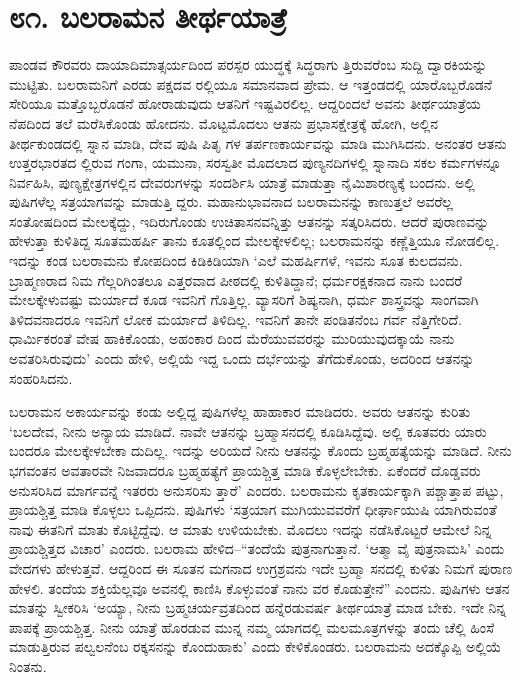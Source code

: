 
\chapter{೮೧. ಬಲರಾಮನ ತೀರ್ಥಯಾತ್ರೆ}

ಪಾಂಡವ ಕೌರವರು ದಾಯಾದಿಮಾತ್ಸರ್ಯದಿಂದ ಪರಸ್ಪರ ಯುದ್ಧಕ್ಕೆ ಸಿದ್ಧರಾಗು ತ್ತಿರುವರೆಂಬ ಸುದ್ದಿ ದ್ವಾರಕಿಯನ್ನು ಮುಟ್ಟಿತು. ಬಲರಾಮನಿಗೆ ಎರಡು ಪಕ್ಷದವ ರಲ್ಲಿಯೂ ಸಮಾನವಾದ ಪ್ರೇಮ. ಆ ಇತ್ತಂಡದಲ್ಲಿ ಯಾರೊಬ್ಬರೊಡನೆ ಸೇರಿಯೂ ಮತ್ತೊಬ್ಬರೊಡನೆ ಹೋರಾಡುವುದು ಆತನಿಗೆ ಇಷ್ಟವಿರಲಿಲ್ಲ. ಆದ್ದರಿಂದಲೆ ಅವನು ತೀರ್ಥಯಾತ್ರೆಯ ನೆಪದಿಂದ ತಲೆ ಮರೆಸಿಕೊಂಡು ಹೋದನು. ಮೊಟ್ಟಮೊದಲು ಆತನು ಪ್ರಭಾಸಕ್ಷೇತ್ರಕ್ಕೆ ಹೋಗಿ, ಅಲ್ಲಿನ ತೀರ್ಥಕುಂಡದಲ್ಲಿ ಸ್ನಾನ ಮಾಡಿ, ದೇವ ಪುಷಿ ಪಿತೃ ಗಳ ತರ್ಪಣಕಾರ್ಯವನ್ನು ಮಾಡಿ ಮುಗಿಸಿದನು. ಅನಂತರ ಆತನು ಉತ್ತರಭಾರತದ ಲ್ಲಿರುವ ಗಂಗಾ, ಯಮುನಾ, ಸರಸ್ವತೀ ಮೊದಲಾದ ಪುಣ್ಯನದಿಗಳಲ್ಲಿ ಸ್ನಾನಾದಿ ಸಕಲ ಕರ್ಮಗಳನ್ನೂ ನಿರ್ವಹಿಸಿ, ಪುಣ್ಯಕ್ಷೇತ್ರಗಳಲ್ಲಿನ ದೇವರುಗಳನ್ನು ಸಂದರ್ಶಿಸಿ ಯಾತ್ರೆ ಮಾಡುತ್ತಾ ನೈಮಿಶಾರಣ್ಯಕ್ಕೆ ಬಂದನು. ಅಲ್ಲಿ ಪುಷಿಗಳೆಲ್ಲ ಸತ್ರಯಾಗವನ್ನು ಮಾಡುತ್ತಿ ದ್ದರು. ಮಹಾನುಭಾವನಾದ ಬಲರಾಮನನ್ನು ಕಾಣುತ್ತಲೆ ಅವರೆಲ್ಲ ಸಂತೋಷದಿಂದ ಮೇಲಕ್ಕೆದ್ದು, ಇದಿರುಗೊಂಡು ಉಚಿತಾಸನವನ್ನಿತ್ತು ಆತನನ್ನು ಸತ್ಕರಿಸಿದರು. ಆದರೆ ಪುರಾಣವನ್ನು ಹೇಳುತ್ತಾ ಕುಳಿತಿದ್ದ ಸೂತಮಹರ್ಷಿ ತಾನು ಕೂತಲ್ಲಿಂದ ಮೇಲಕ್ಕೇಳಲಿಲ್ಲ; ಬಲರಾಮನನ್ನು ಕಣ್ಣೆತ್ತಿಯೂ ನೋಡಲಿಲ್ಲ. ಇದನ್ನು ಕಂಡ ಬಲರಾಮನು ಕೋಪದಿಂದ ಕಿಡಿಕಿಡಿಯಾಗಿ ‘ಎಲೆ ಮಹರ್ಷಿಗಳೆ, ಇವನು ಸೂತ ಕುಲದವನು. ಬ್ರಾಹ್ಮಣರಾದ ನಿಮ ಗೆಲ್ಲರಿಗಿಂತಲೂ ಎತ್ತರವಾದ ಪೀಠದಲ್ಲಿ ಕುಳಿತಿದ್ದಾನೆ; ಧರ್ಮರಕ್ಷಕನಾದ ನಾನು ಬಂದರೆ ಮೇಲಕ್ಕೇಳುವಷ್ಟು ಮರ್ಯಾದೆ ಕೂಡ ಇವನಿಗೆ ಗೊತ್ತಿಲ್ಲ. ವ್ಯಾಸರಿಗೆ ಶಿಷ್ಯನಾಗಿ, ಧರ್ಮ ಶಾಸ್ತ್ರವನ್ನು ಸಾಂಗವಾಗಿ ತಿಳಿದವನಾದರೂ ಇವನಿಗೆ ಲೋಕ ಮರ್ಯಾದೆ ತಿಳಿದಿಲ್ಲ. ಇವನಿಗೆ ತಾನೇ ಪಂಡಿತನೆಂಬ ಗರ್ವ ನೆತ್ತಿಗೇರಿದೆ. ಧಾರ್ಮಿಕರಂತೆ ವೇಷ ಹಾಕಿಕೊಂಡು, ಅಹಂಕಾರ ದಿಂದ ಮೆರೆಯುವವರನ್ನು ಮುರಿಯುವುದಕ್ಕಾಯೆ ನಾನು ಅವತರಿಸಿರುವುದು’ ಎಂದು ಹೇಳಿ, ಅಲ್ಲಿಯೆ ಇದ್ದ ಒಂದು ದರ್ಭೆಯನ್ನು ತೆಗೆದುಕೊಂಡು, ಅದರಿಂದ ಆತನನ್ನು ಸಂಹರಿಸಿದನು.

ಬಲರಾಮನ ಅಕಾರ್ಯವನ್ನು ಕಂಡು ಅಲ್ಲಿದ್ದ ಪುಷಿಗಳೆಲ್ಲ ಹಾಹಾಕಾರ ಮಾಡಿದರು. ಅವರು ಆತನನ್ನು ಕುರಿತು ‘ಬಲದೇವ, ನೀನು ಅನ್ಯಾಯ ಮಾಡಿದೆ. ನಾವೇ ಆತನನ್ನು ಬ್ರಹ್ಮಾಸನದಲ್ಲಿ ಕೂಡಿಸಿದ್ದೆವು. ಅಲ್ಲಿ ಕೂತವರು ಯಾರು ಬಂದರೂ ಮೇಲಕ್ಕೇಳಬೇಕಾ ದುದಿಲ್ಲ. ಇದನ್ನು ಅರಿಯದೆ ನೀನು ಆತನನ್ನು ಕೊಂದು ಬ್ರಹ್ಮಹತ್ಯೆಯನ್ನು ಮಾಡಿದೆ. ನೀನು ಭಗವಂತನ ಅವತಾರವೇ ನಿಜವಾದರೂ ಬ್ರಹ್ಮಹತ್ಯೆಗೆ ಪ್ರಾಯಶ್ಚಿತ್ತ ಮಾಡಿ ಕೊಳ್ಳಲೇಬೇಕು. ಏಕೆಂದರೆ ದೊಡ್ಡವರು ಅನುಸರಿಸಿದ ಮಾರ್ಗವನ್ನೆ ಇತರರು ಅನುಸರಿಸು ತ್ತಾರೆ’ ಎಂದರು. ಬಲರಾಮನು ಕೃತಕಾರ್ಯಕ್ಕಾಗಿ ಪಶ್ಚಾತ್ತಾಪ ಪಟ್ಟು, ಪ್ರಾಯಶ್ಚಿತ್ತ ಮಾಡಿ ಕೊಳ್ಳಲು ಒಪ್ಪಿದನು. ಪುಷಿಗಳು ‘ಸತ್ರಯಾಗ ಮುಗಿಯುವವರೆಗೆ ಧೀರ್ಘಾಯುಷಿ ಯಾಗಿರುವಂತೆ ನಾವು ಈತನಿಗೆ ಮಾತು ಕೊಟ್ಟಿದ್ದೆವು. ಆ ಮಾತು ಉಳಿಯಬೇಕು. ಮೊದಲು ಇದನ್ನು ನಡೆಸಿಕೊಟ್ಟರೆ ಆಮೇಲೆ ನಿನ್ನ ಪ್ರಾಯಶ್ಚಿತ್ತದ ವಿಚಾರ’ ಎಂದರು. ಬಲರಾಮ ಹೇಳಿದ–“ತಂದೆಯೆ ಪುತ್ರನಾಗುತ್ತಾನೆ. ‘ಆತ್ಮಾ ವೈ ಪುತ್ರನಾಮಸಿ’ ಎಂದು ವೇದಗಳು ಹೇಳುತ್ತವೆ. ಆದ್ದರಿಂದ ಈ ಸೂತನ ಮಗನಾದ ಉಗ್ರಶ್ರವನು ಇದೇ ಬ್ರಹ್ಮಾ ಸನದಲ್ಲಿ ಕುಳಿತು ನಿಮಗೆ ಪುರಾಣ ಹೇಳಲಿ. ತಂದೆಯ ಶಕ್ತಿಯೆಲ್ಲವೂ ಅವನಲ್ಲಿ ಕಾಣಿಸಿ ಕೊಳ್ಳುವಂತೆ ನಾನು ವರ ಕೊಡುತ್ತೇನೆ” ಎಂದನು. ಪುಷಿಗಳು ಆತನ ಮಾತನ್ನು ಸ್ವೀಕರಿಸಿ ‘ಅಯ್ಯಾ, ನೀನು ಬ್ರಹ್ಮಚರ್ಯವ್ರತದಿಂದ ಹನ್ನೆರಡುವರ್ಷ ತೀರ್ಥಯಾತ್ರೆ ಮಾಡ ಬೇಕು. ಇದೇ ನಿನ್ನ ಪಾಪಕ್ಕೆ ಪ್ರಾಯಶ್ಚಿತ್ತ. ನೀನು ಯಾತ್ರೆ ಹೊರಡುವ ಮುನ್ನ ನಮ್ಮ ಯಾಗದಲ್ಲಿ ಮಲಮೂತ್ರಗಳನ್ನು ತಂದು ಚೆಲ್ಲಿ ಹಿಂಸೆ ಮಾಡುತ್ತಿರುವ ಪಲ್ವಲನೆಂಬ ರಕ್ಕಸನನ್ನು ಕೊಂದುಹಾಕು’ ಎಂದು ಕೇಳಿಕೊಂಡರು. ಬಲರಾಮನು ಅದಕ್ಕೊಪ್ಪಿ ಅಲ್ಲಿಯೆ ನಿಂತನು.

